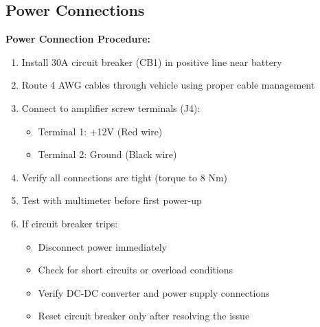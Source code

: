 \documentclass[11pt,a4paper]{article}
\begin{document}
\subsection{Power Connections}

\begin{center}
\end{center}

\textbf{Power Connection Procedure:}
\begin{enumerate}
    \item Install 30A circuit breaker (CB1) in positive line near battery
    \item Route 4 AWG cables through vehicle using proper cable management
    \item Connect to amplifier screw terminals (J4):
    \begin{itemize}
        \item Terminal 1: +12V (Red wire)
        \item Terminal 2: Ground (Black wire)
    \end{itemize}
    \item Verify all connections are tight (torque to 8 Nm)
    \item Test with multimeter before first power-up
    \item If circuit breaker trips:
    \begin{itemize}
        \item Disconnect power immediately
        \item Check for short circuits or overload conditions
        \item Verify DC-DC converter and power supply connections
        \item Reset circuit breaker only after resolving the issue
    \end{itemize}
\end{enumerate}
\end{document}
